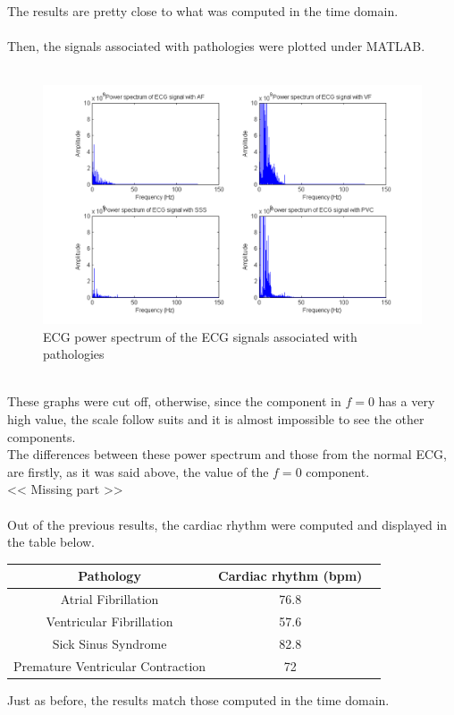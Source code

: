 \documentclass[11pt]{report}
\begin{document}
		The results are pretty close to what was computed in the time domain.\\
		\\
		Then, the signals associated with pathologies were plotted under MATLAB.\\
		\\
		\begin{figure}[ht]
			\centering
			\includegraphics[scale=0.65]{images/Q322.png}
			\caption{ECG power spectrum of the ECG signals associated with pathologies}
			\label{Q322}
		\end{figure}
		\\
		These graphs were cut off, otherwise, since the component in $f = 0$ has a very high value, the scale follow suits and it is almost impossible to see the other components.\\
		The differences between these power spectrum and those from the normal ECG, are firstly, as it was said above, the value of the $f=0$ component.\\
		<< Missing part >>
		\\
		\\
		Out of the previous results, the cardiac rhythm were computed and displayed in the table below. 
		\begin{center}
			\begin{tabular}{|c|c|c|}
				\hline
				\textbf{Pathology} & \textbf{Cardiac rhythm (bpm)} \\
				\hline
				Atrial Fibrillation & 76.8 \\ 
				\hline
				Ventricular Fibrillation & 57.6 \\
				\hline
				Sick Sinus Syndrome & 82.8 \\
				\hline
				Premature Ventricular Contraction & 72 \\
				\hline
			\end{tabular}
		\end{center}
		Just as before, the results match those computed in the time domain.
\end{document}
